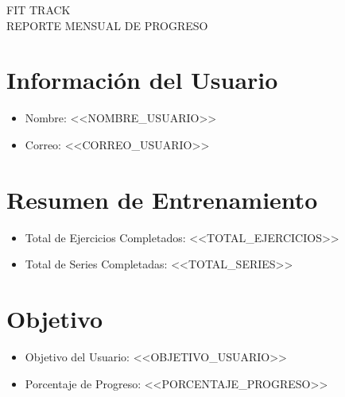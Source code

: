 \documentclass{article}
\begin{document}
\begin{center}
    {\Large FIT TRACK} \\ %
    \vspace{0.5cm}
    {\Large REPORTE MENSUAL DE PROGRESO} %
\end{center}

\section*{Información del Usuario}
\begin{itemize}
    \item Nombre: <<NOMBRE_USUARIO>>
    \item Correo: <<CORREO_USUARIO>>
\end{itemize}

\section*{Resumen de Entrenamiento}
\begin{itemize}
    \item Total de Ejercicios Completados: <<TOTAL_EJERCICIOS>>
    \item Total de Series Completadas: <<TOTAL_SERIES>>
\end{itemize}

\section*{Objetivo}
\begin{itemize}
    \item Objetivo del Usuario: <<OBJETIVO_USUARIO>>
    \item Porcentaje de Progreso: <<PORCENTAJE_PROGRESO>>
\end{itemize}
\end{document}
